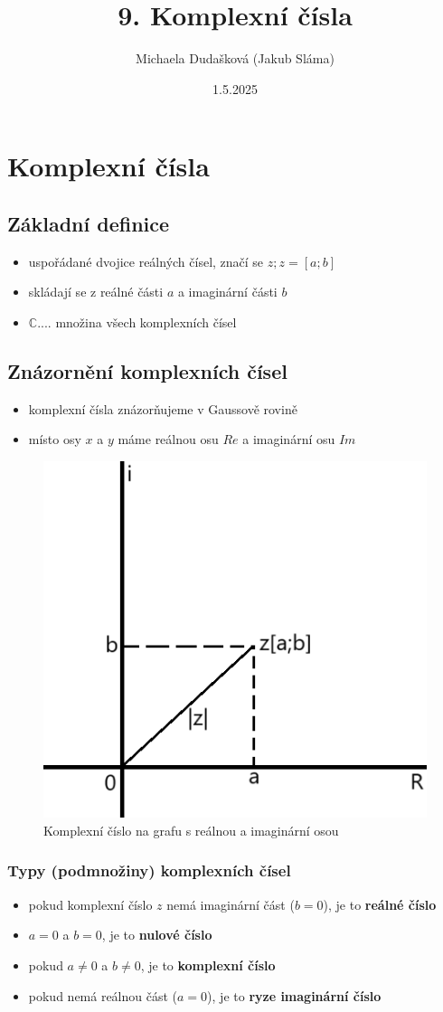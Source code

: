 \title{9. Komplexní čísla}
\author{Michaela Dudašková (Jakub Sláma)}
\date{1.5.2025}

\maketitle

\section{Komplexní čísla}

\subsection{Základní definice}
    \begin{itemize}
        \item uspořádané dvojice reálných čísel, značí se $z;z=[a;b]$
        \item skládají se z reálné části $a$ a imaginární části $b$
        \item $\mathbb{C} ....$ množina všech komplexních čísel
    \end{itemize}
    
\subsection{Znázornění komplexních čísel}
    \begin{itemize}
        \item komplexní čísla znázorňujeme v Gaussově rovině
        \item místo osy $x$ a $y$ máme reálnou osu $Re$ a imaginární osu $Im$
    \end{itemize}
    
    \begin{figure}[H]
        \centering
        \includegraphics[width=0.2\linewidth]{img/9_graf_komlexniho_cisla.png}
        \caption{Komplexní číslo na grafu s reálnou a imaginární osou}
        \label{fig:enter-label}
    \end{figure}
    
\subsubsection{Typy (podmnožiny) komplexních čísel}
    \begin{itemize}
        \item pokud komplexní číslo $z$ nemá imaginární část ($b=0$), je to \textbf{reálné číslo}
        \item $a=0$ a $b=0$, je to \textbf{nulové číslo}
        \item pokud $a \neq 0$ a $b \neq 0$, je to \textbf{komplexní číslo}
        \item pokud nemá reálnou část ($a=0$), je to \textbf{ryze imaginární číslo}
    \end{itemize}
    

